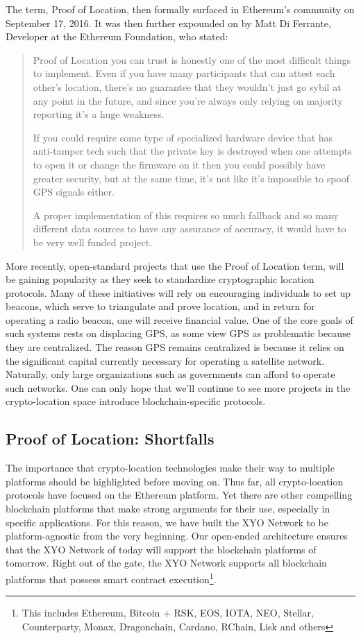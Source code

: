 \documentclass{article}
\begin{document}
The term, Proof of Location, then formally surfaced in Ethereum's community on September 17, 2016. It was then further expounded on by Matt Di Ferrante, Developer at the Ethereum Foundation, who stated:

\begin{quotation}
Proof of Location you can trust is honestly one of the most difficult things to implement. Even if you have many participants that can attest each other's location, there's no guarantee that they wouldn't just go sybil at any point in the future, and since you're always only relying on majority reporting it's a huge weakness.

If you could require some type of specialized hardware device that has anti-tamper tech such that the private key is destroyed when one attempts to open it or change the firmware on it then you could possibly have greater security, but at the same time, it's not like it's impossible to spoof GPS signals either.

A proper implementation of this requires so much fallback and so many different data sources to have any assurance of accuracy, it would have to be very well funded project.
\end{quotation}

More recently, open-standard projects that use the Proof of Location term, will be gaining popularity as they seek to standardize cryptographic location protocols. Many of these initiatives will rely on encouraging individuals to set up beacons, which serve to triangulate and prove location, and in return for operating a radio beacon, one will receive financial value. One of the core goals of such systems rests on displacing GPS, as some view GPS as problematic because they are centralized. The reason GPS remains centralized is because it relies on the significant capital currently necessary for operating a satellite network. Naturally, only large organizations such as governments can afford to operate such networks. One can only hope that we'll continue to see more projects in the crypto-location space introduce blockchain-specific protocols.

\subsection {Proof of Location: Shortfalls}
The importance that crypto-location technologies make their way to multiple platforms should be highlighted before moving on. Thus far, all crypto-location protocols have focused on the Ethereum platform. Yet there are other compelling blockchain platforms that make strong arguments for their use, especially in specific applications. For this reason, we have built the XYO Network to be platform-agnostic from the very beginning. Our open-ended architecture ensures that the XYO Network of today will support the blockchain platforms of tomorrow. Right out of the gate, the XYO Network supports all blockchain platforms that possess smart contract execution\footnote{This includes Ethereum, Bitcoin + RSK, EOS, IOTA, NEO, Stellar, Counterparty, Monax, Dragonchain, Cardano, RChain, Lisk and others}.
\end{document}
